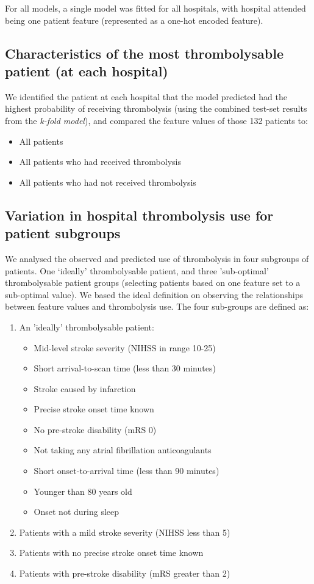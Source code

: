 For all models, a single model was fitted for all hospitals, with hospital attended being one patient feature (represented as a one-hot encoded feature).

\subsection{Characteristics of the most thrombolysable patient (at each hospital)}
We identified the patient at each hospital that the model predicted had the highest probability of receiving thrombolysis (using the combined test-set results from the \emph{k-fold model}), and compared the feature values of those 132 patients to:
\begin{itemize}
\item All patients
\item All patients who had received thrombolysis
\item All patients who had not received thrombolysis
\end{itemize}
\subsection{Variation in hospital thrombolysis use for patient subgroups}

\iffalse
We analysed the observed and predicted use of thrombolysis in four subgroups of patients. One `ideally' thrombolysable patient, and three 'sub-optimal' thrombolysable patient groups (selecting patients based on one feature set to a sub-optimal value). We based the ideal definition on observing the relationships between feature values and thrombolysis use. The four sub-groups are defined as:

\begin{enumerate}
  \item An 'ideally' thrombolysable patient:
  \begin{itemize}
    \item Mid-level stroke severity (NIHSS in range 10-25)
    \item Short arrival-to-scan time (less than 30 minutes)
    \item Stroke caused by infarction
    \item Precise stroke onset time known
    \item No pre-stroke disability (mRS 0)
    \item Not taking any atrial fibrillation anticoagulants
    \item Short onset-to-arrival time (less than 90 minutes)
    \item Younger than 80 years old
    \item Onset not during sleep
  \end{itemize}
  \item Patients with a mild stroke severity (NIHSS less than 5)
  \item Patients with no precise stroke onset time known
  \item Patients with pre-stroke disability (mRS greater than 2)
\end{enumerate}

